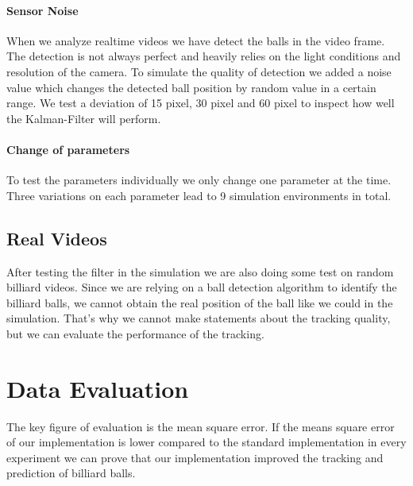 \documentclass[titlepage, a4paper, 11pt]{scrartcl}
\begin{document}
\paragraph{Sensor Noise}

When we analyze realtime videos we have detect the balls in the video frame.
The detection is not always perfect and heavily relies on the light conditions and resolution of the camera.
To simulate the quality of detection we added a noise value which changes the detected ball position by random value in a certain range.
We test a deviation of 15 pixel, 30 pixel and 60 pixel to inspect how well the Kalman-Filter will perform.

\paragraph{Change of parameters}

To test the parameters individually we only change one parameter at the time.
Three variations on each parameter lead to 9 simulation environments in total.

\subsection{Real Videos}

After testing the filter in the simulation we are also doing some test on random billiard videos.
Since we are relying on a ball detection algorithm to identify the billiard balls, we cannot obtain the real position of the ball like we could in the simulation.
That's why we cannot make statements about the tracking quality, but we can evaluate the performance of the tracking.

\section{Data Evaluation}

The key figure of evaluation is the mean square error.
If the means square error of our implementation is lower compared to the standard implementation in every experiment we can prove that our implementation improved the tracking and prediction of billiard balls.

 

\end{document}
